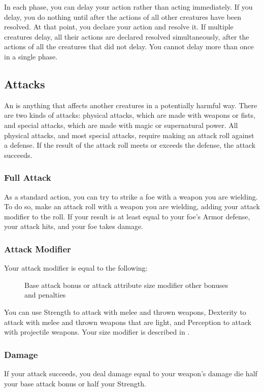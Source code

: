 \label{Delaying}
In each phase, you can delay your action rather than acting immediately. If you delay, you do nothing until after the actions of all other creatures have been resolved. At that point, you declare your action and resolve it. If multiple creatures delay, all their actions are declared resolved simultaneously, after the actions of all the creatures that did not delay. You cannot delay more than once in a single phase.

\subsection{Attacks}\label{Attacks}
An  is anything that affects another creatures in a potentially harmful way. There are two kinds of attacks: physical attacks, which are made with weapons or fists, and special attacks, which are made with magic or supernatural power. All physical attacks, and most special attacks, require making an attack roll against a defense. If the result of the attack roll meets or exceeds the defense, the attack succeeds.

\subsubsection{Full Attack}
As a standard action, you can try to strike a foe with a weapon you are wielding. To do so, make an attack roll with a weapon you are wielding, adding your attack modifier to the roll. If your result is at least equal to your foe's Armor defense, your attack hits, and your foe takes damage.

\subsubsection{Attack Modifier}
Your attack modifier is equal to the following:

\begin{figure}[h]
    \centering Base attack bonus or attack attribute  \add size modifier \add other bonuses and penalties
\end{figure}

You can use Strength to attack with melee and thrown weapons, Dexterity to attack with melee and thrown weapons that are light, and Perception to attack with projectile weapons. Your size modifier is described in .

\subsubsection{Damage}
If your attack succeeds, you deal damage equal to your weapon's damage die \add half your base attack bonus or half your Strength.

